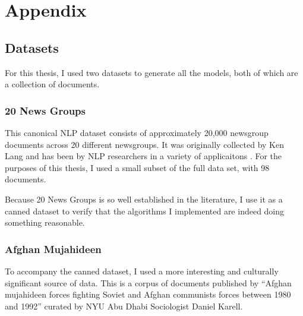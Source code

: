 \documentclass[12pt]{pom_thesis}
\begin{document}
\section*{Appendix}
\subsection*{Datasets}
For this thesis, I used two datasets to generate all the models, both of which are a collection of documents. 
\subsubsection*{20 News Groups}
This canonical NLP dataset consists of approximately 20,000 newsgroup documents across 20 different newsgroups. It was originally collected by Ken Lang and has been by NLP researchers in a variety of applicaitons \cite{20news}. For the purposes of this thesis, I used a small subset of the full data set, with 98 documents. 

Because 20 News Groups is so well established in the literature, I use it as a canned dataset to verify that the algorithms I implemented are indeed doing something reasonable. 
\subsubsection*{Afghan Mujahideen}
To accompany the canned dataset, I used a more interesting and culturally significant source of data. This is a corpus of documents published by ``Afghan mujahideen forces fighting Soviet and Afghan communists forces between 1980 and 1992'' curated by NYU Abu Dhabi Sociologist Daniel Karell.
\end{document}

